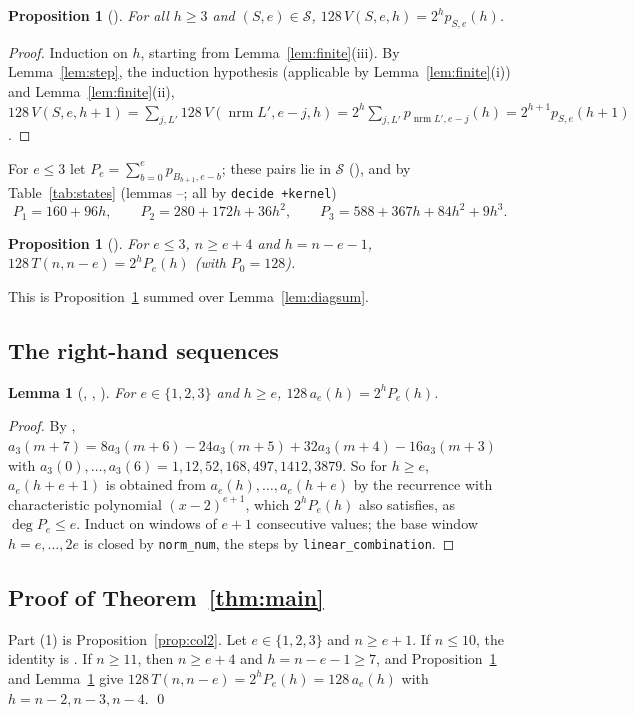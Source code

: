 \documentclass[11pt]{amsart}
\theoremstyle{plain}
\newtheorem{lemma}[theorem]{Lemma}
\newtheorem{proposition}[theorem]{Proposition}
\theoremstyle{definition}
\newcommand{\nrm}{\operatorname{nrm}}
\newcommand{\St}{\mathcal{S}}
\begin{document}
\begin{proposition}[]\label{prop:main}
For all $h\ge3$ and $(S,e)\in\St$, $128\,V(S,e,h)=2^hp_{S,e}(h)$.
\end{proposition}
\begin{proof}
Induction on $h$, starting from Lemma~\ref{lem:finite}(iii). By Lemma~\ref{lem:step}, the induction hypothesis (applicable by Lemma~\ref{lem:finite}(i)) and Lemma~\ref{lem:finite}(ii),
$128\,V(S,e,h+1)=\sum_{j,L'}128\,V(\nrm L',e-j,h)=2^h\sum_{j,L'}p_{\nrm L',e-j}(h)=2^{h+1}p_{S,e}(h+1)$.
\end{proof}

For $e\le3$ let $P_e=\sum_{b=0}^{e}p_{B_{b+1},e-b}$; these pairs lie in $\St$ (), and by Table~\ref{tab:states} (lemmas --; all by \texttt{decide +kernel})
\[
P_1=160+96h,\qquad P_2=280+172h+36h^2,\qquad P_3=588+367h+84h^2+9h^3 .
\]
\begin{proposition}[]\label{prop:diag}
For $e\le3$, $n\ge e+4$ and $h=n-e-1$, $128\,T(n,n-e)=2^hP_e(h)$ (with $P_0=128$).
\end{proposition}
\noindent This is Proposition~\ref{prop:main} summed over Lemma~\ref{lem:diagsum}.

\subsection{The right-hand sequences}
\begin{lemma}[, , ]\label{lem:seq}
For $e\in\{1,2,3\}$ and $h\ge e$, $128\,a_e(h)=2^hP_e(h)$.
\end{lemma}
\begin{proof}
By , $a_3(m+7)=8a_3(m+6)-24a_3(m+5)+32a_3(m+4)-16a_3(m+3)$ with $a_3(0),\dots,a_3(6)=1,12,52,168,497,1412,3879$. So for $h\ge e$, $a_e(h+e+1)$ is obtained from $a_e(h),\dots,a_e(h+e)$ by the recurrence with characteristic polynomial $(x-2)^{e+1}$, which $2^hP_e(h)$ also satisfies, as $\deg P_e\le e$. Induct on windows of $e+1$ consecutive values; the base window $h=e,\dots,2e$ is closed by \texttt{norm\_num}, the steps by \texttt{linear\_combination}.
\end{proof}

\subsection{Proof of Theorem~\ref{thm:main}}
Part (1) is Proposition~\ref{prop:col2}. Let $e\in\{1,2,3\}$ and $n\ge e+1$. If $n\le10$, the identity is . If $n\ge11$, then $n\ge e+4$ and $h=n-e-1\ge7$, and Proposition~\ref{prop:diag} and Lemma~\ref{lem:seq} give $128\,T(n,n-e)=2^hP_e(h)=128\,a_e(h)$ with $h=n-2,n-3,n-4$. \qed
\end{document}
